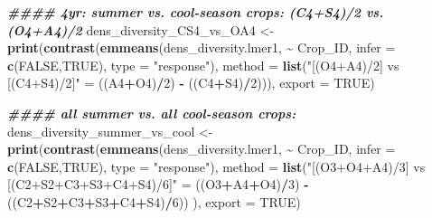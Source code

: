\documentclass[
]{article}
\newenvironment{Shaded}{\begin{snugshade}}{\end{snugshade}}
\newcommand{\AttributeTok}[1]{\textcolor[rgb]{0.13,0.29,0.53}{#1}}
\newcommand{\ConstantTok}[1]{\textcolor[rgb]{0.56,0.35,0.01}{#1}}
\newcommand{\DecValTok}[1]{\textcolor[rgb]{0.00,0.00,0.81}{#1}}
\newcommand{\DocumentationTok}[1]{\textcolor[rgb]{0.56,0.35,0.01}{\textbf{\textit{#1}}}}
\newcommand{\FunctionTok}[1]{\textcolor[rgb]{0.13,0.29,0.53}{\textbf{#1}}}
\newcommand{\NormalTok}[1]{#1}
\newcommand{\OtherTok}[1]{\textcolor[rgb]{0.56,0.35,0.01}{#1}}
\newcommand{\SpecialCharTok}[1]{\textcolor[rgb]{0.81,0.36,0.00}{\textbf{#1}}}
\newcommand{\StringTok}[1]{\textcolor[rgb]{0.31,0.60,0.02}{#1}}
\begin{document}
\begin{Shaded}
\begin{Highlighting}[]
\DocumentationTok{\#\#\#\# 4yr: summer vs. cool{-}season crops: (C4+S4)/2 vs. (O4+A4)/2 }
\NormalTok{dens\_diversity\_CS4\_vs\_OA4 }\OtherTok{\textless{}{-}} \FunctionTok{print}\NormalTok{(}\FunctionTok{contrast}\NormalTok{(}\FunctionTok{emmeans}\NormalTok{(dens\_diversity.lmer1, }\SpecialCharTok{\textasciitilde{}}\NormalTok{ Crop\_ID,}
                                                    \AttributeTok{infer =} \FunctionTok{c}\NormalTok{(}\ConstantTok{FALSE}\NormalTok{,}\ConstantTok{TRUE}\NormalTok{),}
                                                    \AttributeTok{type =} \StringTok{"response"}\NormalTok{), }
                                            \AttributeTok{method =} \FunctionTok{list}\NormalTok{(}\StringTok{"[(O4+A4)/2] vs [(C4+S4)/2]"} \OtherTok{=} 
\NormalTok{                                                            ((A4}\SpecialCharTok{+}\NormalTok{O4)}\SpecialCharTok{/}\DecValTok{2}\NormalTok{) }\SpecialCharTok{{-}}\NormalTok{ ((C4}\SpecialCharTok{+}\NormalTok{S4)}\SpecialCharTok{/}\DecValTok{2}\NormalTok{))), }
                                   \AttributeTok{export =} \ConstantTok{TRUE}\NormalTok{)}

\DocumentationTok{\#\#\#\# all summer vs. all cool{-}season crops: }
\NormalTok{dens\_diversity\_summer\_vs\_cool }\OtherTok{\textless{}{-}} \FunctionTok{print}\NormalTok{(}\FunctionTok{contrast}\NormalTok{(}\FunctionTok{emmeans}\NormalTok{(dens\_diversity.lmer1, }\SpecialCharTok{\textasciitilde{}}\NormalTok{ Crop\_ID, }
                                                        \AttributeTok{infer =} \FunctionTok{c}\NormalTok{(}\ConstantTok{FALSE}\NormalTok{,}\ConstantTok{TRUE}\NormalTok{),}
                                                        \AttributeTok{type =} \StringTok{"response"}\NormalTok{),}
                                                \AttributeTok{method =} \FunctionTok{list}\NormalTok{(}\StringTok{"[(O3+O4+A4)/3] vs [(C2+S2+C3+S3+C4+S4)/6]"} \OtherTok{=}
\NormalTok{                                                                 ((O3}\SpecialCharTok{+}\NormalTok{A4}\SpecialCharTok{+}\NormalTok{O4)}\SpecialCharTok{/}\DecValTok{3}\NormalTok{) }\SpecialCharTok{{-}}\NormalTok{ ((C2}\SpecialCharTok{+}\NormalTok{S2}\SpecialCharTok{+}\NormalTok{C3}\SpecialCharTok{+}\NormalTok{S3}\SpecialCharTok{+}\NormalTok{C4}\SpecialCharTok{+}\NormalTok{S4)}\SpecialCharTok{/}\DecValTok{6}\NormalTok{)) ), }
                                       \AttributeTok{export =} \ConstantTok{TRUE}\NormalTok{)}


\end{Highlighting}
\end{Shaded}
\end{document}
